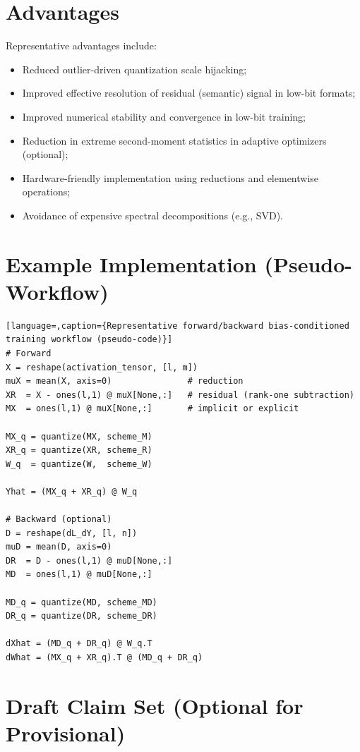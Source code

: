 \documentclass[11pt]{article}
\begin{document}
\section{Advantages}
Representative advantages include:
\begin{itemize}[leftmargin=1.2em]
\item Reduced outlier-driven quantization scale hijacking;
\item Improved effective resolution of residual (semantic) signal in low-bit formats;
\item Improved numerical stability and convergence in low-bit training;
\item Reduction in extreme second-moment statistics in adaptive optimizers (optional);
\item Hardware-friendly implementation using reductions and elementwise operations;
\item Avoidance of expensive spectral decompositions (e.g., SVD).
\end{itemize}

\section{Example Implementation (Pseudo-Workflow)}
\begin{lstlisting}[language=,caption={Representative forward/backward bias-conditioned training workflow (pseudo-code)}]
# Forward
X = reshape(activation_tensor, [l, m])
muX = mean(X, axis=0)               # reduction
XR  = X - ones(l,1) @ muX[None,:]   # residual (rank-one subtraction)
MX  = ones(l,1) @ muX[None,:]       # implicit or explicit

MX_q = quantize(MX, scheme_M)
XR_q = quantize(XR, scheme_R)
W_q  = quantize(W,  scheme_W)

Yhat = (MX_q + XR_q) @ W_q

# Backward (optional)
D = reshape(dL_dY, [l, n])
muD = mean(D, axis=0)
DR  = D - ones(l,1) @ muD[None,:]
MD  = ones(l,1) @ muD[None,:]

MD_q = quantize(MD, scheme_MD)
DR_q = quantize(DR, scheme_DR)

dXhat = (MD_q + DR_q) @ W_q.T
dWhat = (MX_q + XR_q).T @ (MD_q + DR_q)
\end{lstlisting}

\section{Draft Claim Set (Optional for Provisional)}
\end{document}
